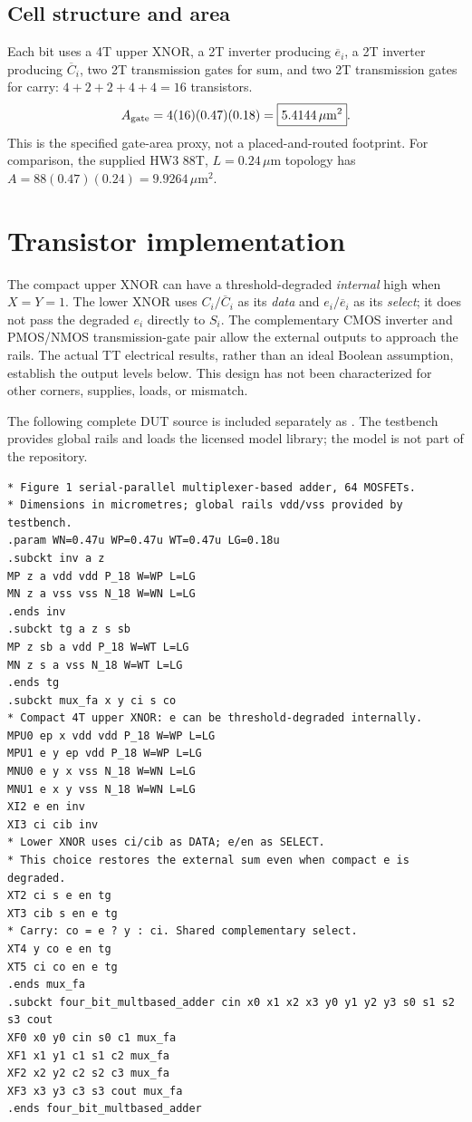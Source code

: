 \documentclass[11pt,a4paper]{article}
\newcommand{\um}{\ensuremath{\,\mu\mathrm{m}}}
\begin{document}
\subsection*{Cell structure and area}
Each bit uses a 4T upper XNOR, a 2T inverter producing $\overline e_i$,
a 2T inverter producing $\overline C_i$, two 2T transmission gates for sum,
and two 2T transmission gates for carry: $4+2+2+4+4=16$ transistors.
\[
A_{\rm gate}=4(16)(0.47)(0.18)=\boxed{5.4144\,\mu\mathrm m^2}.
\]
This is the specified gate-area proxy, not a placed-and-routed footprint.
For comparison, the supplied HW3 88T, $L=0.24\um$ topology has
$A=88(0.47)(0.24)=9.9264\,\mu\mathrm m^2$.

\newpage
\section{Transistor implementation}
The compact upper XNOR can have a threshold-degraded \emph{internal} high
when $X=Y=1$. The lower XNOR uses $C_i/\overline C_i$ as its \emph{data}
and $e_i/\overline e_i$ as its \emph{select}; it does not pass the degraded
$e_i$ directly to $S_i$. The complementary CMOS inverter and PMOS/NMOS
transmission-gate pair allow the external outputs to approach the rails.
The actual TT electrical results, rather than an ideal Boolean assumption,
establish the output levels below. This design has not been characterized
for other corners, supplies, loads, or mismatch.

The following complete DUT source is included separately as
. The testbench provides global rails
and loads the licensed model library; the model is not part of the repository.

{\footnotesize\begin{verbatim}
* Figure 1 serial-parallel multiplexer-based adder, 64 MOSFETs.
* Dimensions in micrometres; global rails vdd/vss provided by testbench.
.param WN=0.47u WP=0.47u WT=0.47u LG=0.18u
.subckt inv a z
MP z a vdd vdd P_18 W=WP L=LG
MN z a vss vss N_18 W=WN L=LG
.ends inv
.subckt tg a z s sb
MP z sb a vdd P_18 W=WT L=LG
MN z s a vss N_18 W=WT L=LG
.ends tg
.subckt mux_fa x y ci s co
* Compact 4T upper XNOR: e can be threshold-degraded internally.
MPU0 ep x vdd vdd P_18 W=WP L=LG
MPU1 e y ep vdd P_18 W=WP L=LG
MNU0 e y x vss N_18 W=WN L=LG
MNU1 e x y vss N_18 W=WN L=LG
XI2 e en inv
XI3 ci cib inv
* Lower XNOR uses ci/cib as DATA; e/en as SELECT.
* This choice restores the external sum even when compact e is degraded.
XT2 ci s e en tg
XT3 cib s en e tg
* Carry: co = e ? y : ci. Shared complementary select.
XT4 y co e en tg
XT5 ci co en e tg
.ends mux_fa
.subckt four_bit_multbased_adder cin x0 x1 x2 x3 y0 y1 y2 y3 s0 s1 s2 s3 cout
XF0 x0 y0 cin s0 c1 mux_fa
XF1 x1 y1 c1 s1 c2 mux_fa
XF2 x2 y2 c2 s2 c3 mux_fa
XF3 x3 y3 c3 s3 cout mux_fa
.ends four_bit_multbased_adder
\end{verbatim}}
\end{document}
